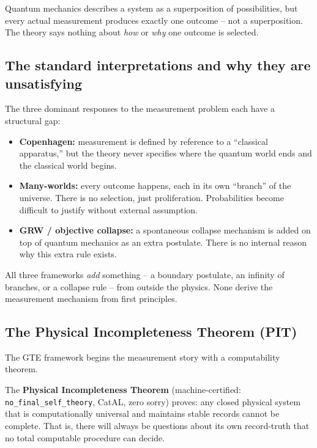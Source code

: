 \documentclass[11pt,a4paper]{article}
\newcommand{\term}[1]{\textbf{#1}}
\newcommand{\lean}[1]{\texttt{#1}}
\begin{document}
\begin{tcolorbox}[colback=boxblue,colframe=blue!40!black,
  title=The measurement problem in one sentence]
Quantum mechanics describes a system as a superposition of possibilities,
but every actual measurement produces exactly one outcome -- not a
superposition.  The theory says nothing about \emph{how} or \emph{why}
one outcome is selected.
\end{tcolorbox}

\subsection{The standard interpretations and why they are unsatisfying}

The three dominant responses to the measurement problem each have a
structural gap:

\begin{itemize}
  \item \textbf{Copenhagen:} measurement is defined by reference to a
    ``classical apparatus,'' but the theory never specifies where the quantum
    world ends and the classical world begins.
  \item \textbf{Many-worlds:} every outcome happens, each in its own
    ``branch'' of the universe. There is no selection, just proliferation.
    Probabilities become difficult to justify without external assumption.
  \item \textbf{GRW / objective collapse:} a spontaneous collapse mechanism
    is added on top of quantum mechanics as an extra postulate.  There is
    no internal reason why this extra rule exists.
\end{itemize}

All three frameworks \emph{add} something -- a boundary postulate, an
infinity of branches, or a collapse rule -- from outside the physics.
None derive the measurement mechanism from first principles.

\subsection{The Physical Incompleteness Theorem (PIT)}

The GTE framework begins the measurement story with a computability theorem.

The \term{Physical Incompleteness Theorem} (machine-certified:
\lean{no\_final\_self\_theory}, CatAL, zero sorry) proves: any closed
physical system that is computationally universal and maintains stable
records cannot be complete.  That is, there will always be questions about
its own record-truth that no total computable procedure can decide.
\end{document}
